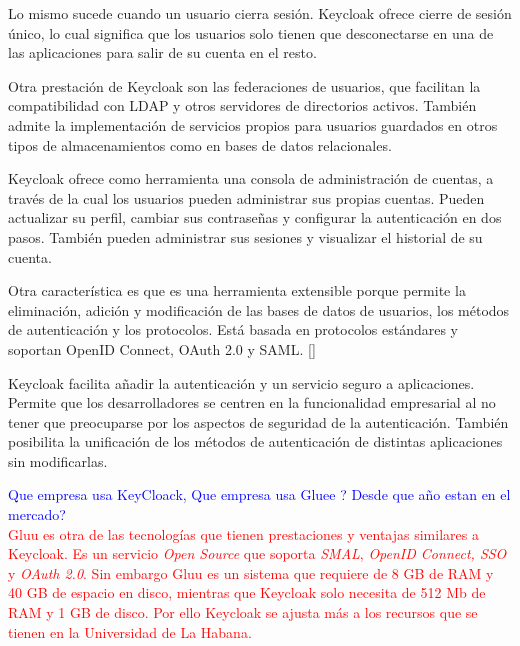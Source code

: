 	Lo mismo sucede cuando un usuario cierra sesión. Keycloak ofrece cierre de sesión único, lo cual significa que los usuarios solo tienen que desconectarse en una de las aplicaciones para salir de su cuenta en el resto. 
	
	Otra prestación de Keycloak son las federaciones de usuarios, que facilitan la compatibilidad con LDAP y otros servidores de directorios activos. También admite la implementación de servicios propios para usuarios guardados en otros tipos de almacenamientos como en bases de datos relacionales. 
	
	Keycloak ofrece como herramienta una consola de administración de cuentas, a través de la cual los usuarios pueden administrar sus propias cuentas. Pueden actualizar su perfil, cambiar sus contraseñas y configurar la autenticación en dos pasos. También pueden administrar sus sesiones y visualizar el historial de su cuenta. 
	
	Otra característica es que es una herramienta extensible porque permite la eliminación, adición y modificación de las bases de datos de usuarios, los métodos de autenticación y los protocolos. Está basada en protocolos estándares y soportan OpenID Connect, OAuth 2.0 y SAML. [\cite{KeycloakDoc}]
	
	Keycloak facilita añadir la autenticación y un servicio seguro a aplicaciones. Permite que los desarrolladores se centren en la funcionalidad empresarial al no tener que preocuparse por los aspectos de seguridad de la autenticación. También posibilita la unificación de los métodos de autenticación de distintas aplicaciones sin modificarlas.
	
	\textcolor{blue}{Que empresa usa KeyCloack, Que empresa usa Gluee ? Desde que año estan en el mercado?}\\
	\textcolor{red}{Gluu es otra de las tecnologías que tienen prestaciones y ventajas similares a Keycloak. Es un servicio \textit{Open Source} que soporta \textit{SMAL}, \textit{OpenID Connect, SSO} y \textit{OAuth 2.0}. Sin embargo Gluu es un sistema que requiere de 8 GB de RAM y 40 GB de espacio en disco, mientras que Keycloak solo necesita de 512 Mb de RAM y 1 GB de disco. Por ello Keycloak se ajusta más a los recursos que se tienen en la Universidad de La Habana.}
	
